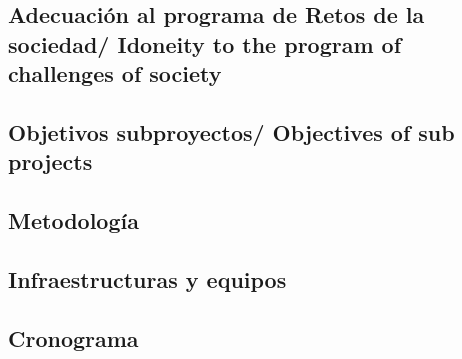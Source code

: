 \documentclass[a4paper,11pt,oneside]{article}
\begin{document}


\subsection*{\sc Adecuación al programa de Retos de la sociedad/ Idoneity to the program of challenges of society  }




\subsection*{\sc Objetivos subproyectos/ Objectives of sub projects}





%
%
%
%
%

%
%

\subsection*{\sc Metodología}

%

\subsection*{\sc Infraestructuras y equipos}

%

\subsection*{\sc Cronograma}
\end{document}
